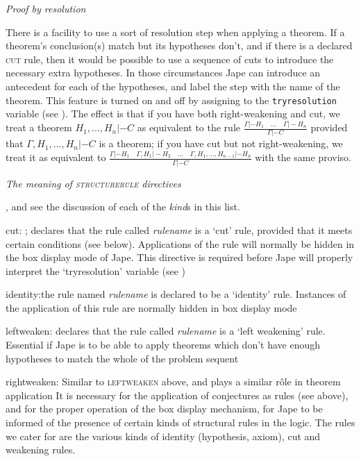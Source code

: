 \textit{Proof by resolution}


There is a facility to use a sort of resolution step when applying a theorem. If a theorem's conclusion(s) match but its hypotheses don't, and if there is a declared \textsc{cut} rule, then it would be possible to use a sequence of cuts to introduce the necessary extra hypotheses. In those circumstances Jape can introduce an antecedent for each of the hypotheses, and label the step with the name of the theorem. This feature is turned on and off by assigning to the \texttt{tryresolution} variable (see ). The effect is that if you have both right-weakening and cut, we treat a theorem $H_{1},...,H_{n}  |- C$ as equivalent to the rule $\frac{\Gamma  |- H_{1} \quad ...\quad \Gamma  |- H_{n} }{\Gamma  |- C} $ provided that $\Gamma,H_{1},...,H_{n}  |- C$ is a theorem; if you have cut but not right-weakening, we treat it as equivalent to $\frac{\Gamma  |- H_{1} \quad \Gamma,H_{1}  |- H_{2} \quad ...\quad \Gamma,H_{1},...,H_{n-1}  |- H_{n} }{\Gamma  |- C} $ with the same proviso.


\textit{The meaning of \textsc{structurerule} directives}

, and see the discussion of each of the \textit{kind}s in this list.

cut: ; declares that the rule called \textit{rulename} is a `cut' rule, provided that it meets certain conditions (see below). Applications of the rule will normally be hidden in the box display mode of Jape. This directive is required before Jape will properly interpret the `tryresolution' variable (see )

identity:the rule named \textit{rulename} is declared to be a `identity' rule. Instances of the application of this rule are normally hidden in box display mode

leftweaken: declares that the rule called \textit{rulename} is a `left weakening' rule. Essential if Jape is to be able to apply theorems which don't have enough hypotheses to match the whole of the problem sequent

rightweaken: Similar to \textsc{leftweaken} above, and plays a similar r\^{o}le in theorem application
It is necessary for the application of conjectures as rules (see above), and for the proper operation of the box display mechanism, for Jape to be informed of the presence of certain kinds of structural rules in the logic. The rules we cater for are the various kinds of identity (hypothesis, axiom), cut and weakening rules.


